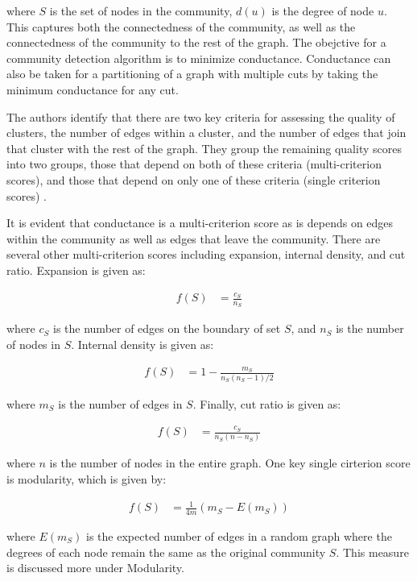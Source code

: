 \documentclass{article}
\begin{document}
where $S$ is the set of nodes in the community, $d(u)$ is the degree of node $u$. This captures both the connectedness of the community, as well as the connectedness of the community to the rest of the graph. The obejctive for a community detection algorithm is to minimize conductance. Conductance can also be taken for a partitioning of a graph with multiple cuts by taking the minimum conductance for any cut.
\par
The authors identify that there are two key criteria for assessing the quality of clusters, the number of edges within a cluster, and the number of edges that join that cluster with the rest of the graph. They group the remaining quality scores into two groups, those that depend on both of these criteria (multi-criterion scores), and those that depend on only one of these criteria (single criterion scores) \cite{Leskovec:2010:ECA:1772690.1772755}.
\par
It is evident that conductance is a multi-criterion score as is depends on edges within the community as well as edges that leave the community. There are several other multi-criterion scores including expansion, internal density, and cut ratio. Expansion is given as:

\begin{align}
    f(S) &= \frac{c_S}{n_S}
\end{align}

where $c_S$ is the number of edges on the boundary of set $S$, and $n_S$ is the number of nodes in $S$. Internal density is given as:

\begin{align}
    f(S) &= 1 - \frac{m_S}{n_S(n_S - 1)/2}
\end{align}

where $m_S$ is the number of edges in $S$. Finally, cut ratio is given as:

\begin{align}
    f(S) &= \frac{c_S}{n_S(n - n_S)}
\end{align}

where $n$ is the number of nodes in the entire graph. One key single cirterion score is modularity, which is given by:

\begin{align}
    f(S) &= \frac{1}{4m}(m_S - E(m_S))
\end{align}

where $E(m_S)$ is the expected number of edges in a random graph where the degrees of each node remain the same as the original community $S$. This measure is discussed more under Modularity.
\end{document}
